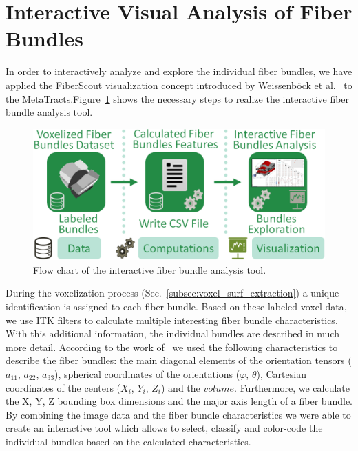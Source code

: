 \section{Interactive Visual Analysis of Fiber Bundles}
\label{subsec:interactive_tool_gui}
In order to interactively analyze and explore the individual fiber bundles, we have applied the FiberScout visualization concept introduced by Weissenb{\"o}ck et al.~\cite{Weissenbock2014} to the MetaTracts.Figure~\ref{fig:metatracts_fiberscout_workflow} shows the necessary steps to realize the interactive fiber bundle analysis tool.
\begin{figure}[htb]
	\centering
	\includegraphics[width=0.95\linewidth]{images/MetaTractsToFiberScout_workflow.eps}
	\caption{Flow chart of the interactive fiber bundle analysis tool.}
	\label{fig:metatracts_fiberscout_workflow}
\end{figure}
During the voxelization process (Sec.~\ref{subsec:voxel_surf_extraction}) a unique identification is assigned to each fiber bundle. Based on these labeled voxel data, we use ITK\cite{Ibanez2005} filters to calculate multiple interesting fiber bundle characteristics. With this additional information, the individual bundles are described in much more detail. According to the work of~\cite{Weissenbock2014} we used the following characteristics to describe the fiber bundles: the main diagonal elements of the orientation tensors ($a_{11}$, $a_{22}$, $a_{33}$), spherical coordinates of the orientations ($\varphi$, $\theta$), Cartesian coordinates of the centers ($X_{i}$, $Y_{i}$, $Z_{i}$) and the $volume$. Furthermore, we calculate the X, Y, Z bounding box dimensions and the major axis length of a fiber bundle. By combining the image data and the fiber bundle characteristics we were able to create an interactive tool which allows to select, classify and color-code the individual bundles based on the calculated characteristics.

